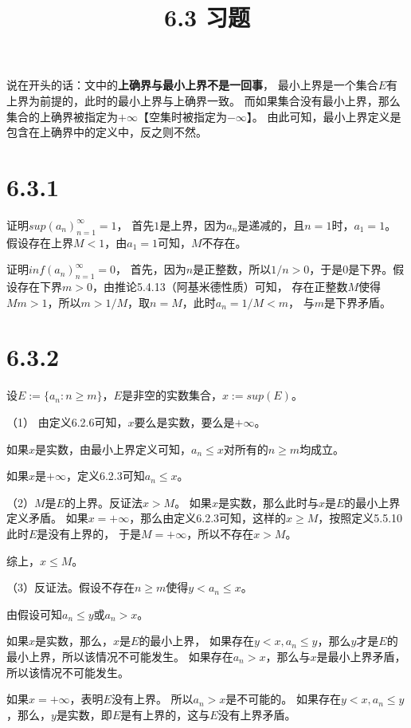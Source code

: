\documentclass{article}
\theoremstyle{mystyle}
\begin{document}
\title{6.3 习题}
\maketitle

说在开头的话：文中的\textbf{上确界与最小上界不是一回事}，
最小上界是一个集合$E$有上界为前提的，此时的最小上界与上确界一致。
而如果集合没有最小上界，那么集合的上确界被指定为$+\infty$【空集时被指定为$-\infty$】。
由此可知，最小上界定义是包含在上确界中的定义中，反之则不然。

\section*{6.3.1}

证明$sup(a_n)_{n=1}^\infty=1$，
首先$1$是上界，因为$a_n$是递减的，且$n=1$时，$a_1 = 1$。
假设存在上界$M < 1$，由$a_1=1$可知，$M$不存在。

证明$inf(a_n)_{n=1}^\infty=0$，
首先，因为$n$是正整数，所以$1/n>0$，于是$0$是下界。假设存在下界$m > 0$，由推论5.4.13（阿基米德性质）可知，
存在正整数$M$使得$Mm > 1$，所以$m > 1/M$，取$n = M$，此时$a_n = 1/M < m$，
与$m$是下界矛盾。

\section*{6.3.2}

设$E := \{a_n : n \geq m\}$，$E$是非空的实数集合，$x := sup(E)$。

（1）
由定义6.2.6可知，$x$要么是实数，要么是$+\infty$。

如果$x$是实数，由最小上界定义可知，$a_n \leq x$对所有的$n \geq m$均成立。

如果$x$是$+\infty$，定义6.2.3可知$a_n \leq x$。


（2）$M$是$E$的上界。反证法$x > M$。
如果$x$是实数，那么此时与$x$是$E$的最小上界定义矛盾。
如果$x=+\infty$，那么由定义6.2.3可知，这样的$x \geq M$，按照定义5.5.10此时$E$是没有上界的，
于是$M = +\infty$，所以不存在$x>M$。

综上，$ x \leq M$。

（3）反证法。假设不存在$n \geq m$使得$y < a_n \leq x$。

由假设可知$a_n \leq y$或$a_n > x$。

如果$x$是实数，那么，$x$是$E$的最小上界，
如果存在$y<x, a_n \leq y$，那么$y$才是$E$的最小上界，所以该情况不可能发生。
如果存在$a_n > x$，那么与$x$是最小上界矛盾，所以该情况不可能发生。

如果$x=+\infty$，表明$E$没有上界。
所以$a_n > x$是不可能的。
如果存在$y < x, a_n \leq y$，那么，$y$是实数，即$E$是有上界的，这与$E$没有上界矛盾。
\end{document}
